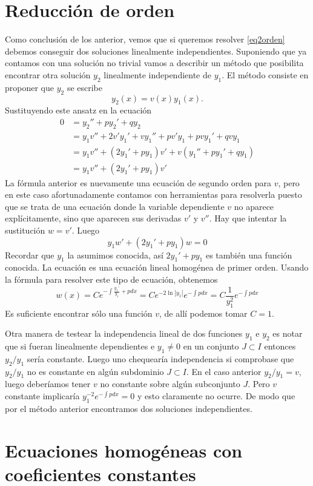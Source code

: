 \section{Reducción de orden}

Como conclusión de los anterior, vemos que si queremos resolver \eqref{eq2orden} debemos conseguir dos soluciones linealmente independientes.
Suponiendo que ya contamos con una solución no trivial vamos a describir un método
que posibilita encontrar otra solución $y_2$ linealmente independiente de $y_1$.
El método consiste en proponer que $y_2$ se escribe
\[\boxed{y_2(x)=v(x)y_1(x)}.\]
Sustituyendo este ansatz en la ecuación
\[
\begin{split}
0&=y_2''+py_2'+qy_2\\
&=y_1v''+2v'y_1'+vy_1''+pv'y_1+pvy_1'+qvy_1\\
&=y_1 v''+(2y_1'+py_1)v'+v(y_1''+py_1'+qy_1)\\
&=y_1 v''+(2y_1'+py_1)v'
\end{split}
\]
La fórmula anterior es nuevamente una ecuación de segundo orden para $v$,
pero en este caso afortunadamente contamos con herramientas para resolverla puesto que se trata de una ecuación donde la
variable dependiente $v$ no aparece explícitamente, sino que aparecen sus derivadas $v'$ y $v''$. Hay que intentar la sustitución $w=v'$.
Luego
\[
y_1w'+(2y_1'+py_1)w=0
\]
Recordar que $y_1$ la asumimos conocida, así $2y_1'+py_1$ es también una función conocida. La ecuación es una ecuación lineal homogénea de primer orden.
Usando la fórmula para resolver este tipo de ecuación, obtenemos
\[w(x)=Ce^{-\int \frac{y_1'}{y_1}+p dx}=Ce^{-2\ln|y_1|}e^{-\int p dx}=C\frac{1}{y_1^2}e^{-\int p dx} \]
Es suficiente encontrar sólo una función $v$, de allí podemos tomar $C=1$.


Otra manera de testear la independencia lineal de dos funciones $y_1$ e $y_2$ es notar que si fueran linealmente dependientes e $y_1\neq 0$
en un conjunto $J\subset I$ entonces $y_2/y_1$
sería constante.
Luego uno chequearía independencia si comprobase que $y_2/y_1$ no es constante en algún subdominio $J\subset I$.
En el caso anterior $y_2/y_1=v$, luego
deberíamos tener $v$ no constante sobre algún subconjunto $J$. Pero $v$ constante implicaría $y_1^{-2}e^{-\int pdx}=0$ y esto claramente no ocurre. De modo que por el
método anterior encontramos dos soluciones independientes.

\section{Ecuaciones homogéneas con coeficientes constantes}

